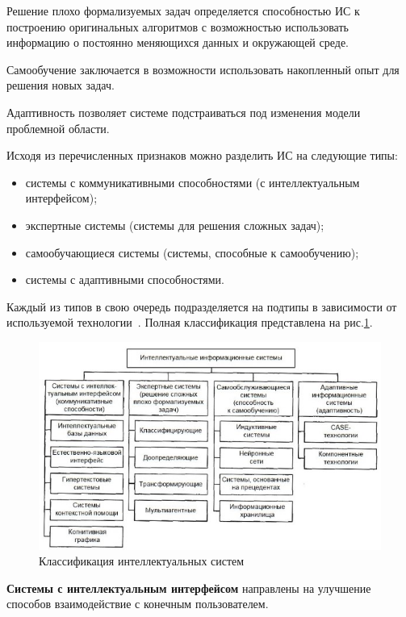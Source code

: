 Решение плохо формализуемых задач определяется способностью ИС к построению оригинальных алгоритмов с возможностью использовать информацию о постоянно меняющихся данных и окружающей среде.
    
Самообучение заключается в возможности использовать накопленный опыт для решения новых задач.
    
Адаптивность позволяет системе подстраиваться под изменения модели проблемной области.
    
Исходя из перечисленных признаков можно разделить ИС на следующие типы:
    
\begin{itemize}
	\item системы с коммуникативными способностями (с интеллектуальным интерфейсом);
	\item экспертные системы (системы для решения сложных задач);
	\item самообучающиеся системы (системы, способные к самообучению);
	\item системы с адаптивными способностями.
\end{itemize}

Каждый из типов в свою очередь подразделяется на подтипы в зависимости от используемой технологии~\cite{is1}. Полная классификация представлена на рис.\ref{fig:ISTypes}.

\begin{figure}[h]
	\centering
	\includegraphics[width=\linewidth]{fig/ISTypes.jpg}
	\caption{Классификация интеллектуальных систем}%
	\label{fig:ISTypes}
\end{figure}

\textbf{Системы с интеллектуальным интерфейсом} направлены на улучшение способов взаимодействие с конечным пользователем.

